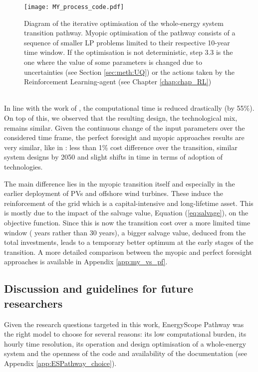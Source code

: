 \begin{figure}[htbp!]
\centering
\texttt{[image: MY\_process\_code.pdf]}
\caption{Diagram of the iterative optimisation of the whole-energy system transition pathway. Myopic optimisation of the pathway consists of a sequence of smaller \gls{LP} problems limited to their respective 10-year time window. If the optimisation is not deterministic, step 3.3 is the one where the value of some parameters is changed due to uncertainties (see Section \ref{sec:meth:UQ}) or the actions taken by the Reinforcement Learning-agent (see Chapter \ref{chap:chap_RL})}
\label{fig:MY_process_code}
\end{figure}

\\

\noindent
In line with the work of \citet{babrowski2014reducing}, the computational time is reduced drastically (\ie by 55\%). On top of this, we observed that the resulting design, \ie the technological mix, remains similar.  Given the continuous change of the input parameters over the considered time frame, the perfect foresight and myopic approaches results are very similar, like in \cite{krey2006vergleich}: less than 1\% cost difference over the transition, similar system designs by 2050 and slight shifts in time in terms of adoption of technologies. 

The main difference lies in the myopic transition itself and especially in the earlier deployment of PVs and offshore wind turbines. These induce the reinforcement of the grid which is a capital-intensive and long-lifetime asset. This is mostly due to the impact of the salvage value, Equation (\ref{eq:salvage}), on the objective function. Since this is now the transition cost over a more limited time window ( years rather than 30 years), a bigger salvage value, deduced from the total investments, leads to a temporary better optimum at the early stages of the transition. A more detailed comparison between the myopic and perfect foresight approaches is available in Appendix \ref{app:my_vs_pf}.

\subsection{Discussion and guidelines for future researchers}
\label{subsec:meth:ES:discussion}
Given the research questions targeted in this work, EnergyScope Pathway was the right model to choose for several reasons: its low computational burden, its hourly time resolution, its operation and design optimisation of a whole-energy system and the openness of the code and availability of the documentation (see Appendix \ref{app:ESPathway_choice}). 

